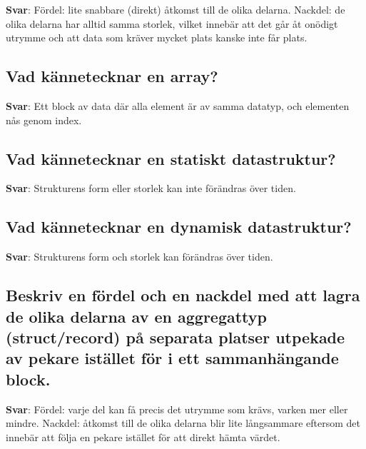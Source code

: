 \documentclass[a4paper,11pt,oneside]{article}
\begin{document}
\begin{sloppypar}
\label{q:272:sa:sv:True}

\textbf{Svar}: F\"ordel: lite snabbare (direkt) \r{a}tkomst till de olika delarna. Nackdel: de olika delarna har alltid samma storlek, vilket inneb\"ar att det g\r{a}r \r{a}t on\"odigt utrymme och att data som kr\"aver mycket plats kanske inte f\r{a}r plats.



\subsection{Vad k\"annetecknar en array?}

\label{q:273:sa:sv:True}

\textbf{Svar}: Ett block av data d\"ar alla element \"ar av samma datatyp, och elementen n\r{a}s genom index.



\subsection{Vad k\"annetecknar en statiskt datastruktur?}

\label{q:274:sa:sv:True}

\textbf{Svar}: Strukturens form eller storlek kan inte f\"or\"andras \"over tiden.



\subsection{Vad k\"annetecknar en dynamisk datastruktur?}

\label{q:275:sa:sv:True}

\textbf{Svar}: Strukturens form och storlek kan f\"or\"andras \"over tiden.



\subsection{Beskriv en f\"ordel och en nackdel med att lagra de olika delarna av en aggregattyp (struct/record) p\r{a} separata platser utpekade av pekare ist\"allet f\"or i ett sammanh\"angande block.}

\label{q:276:sa:sv:True}

\textbf{Svar}: F\"ordel: varje del kan f\r{a} precis det utrymme som kr\"avs, varken mer eller mindre. Nackdel: \r{a}tkomst till de olika delarna blir lite l\r{a}ngsammare eftersom det inneb\"ar att f\"olja en pekare ist\"allet f\"or att direkt h\"amta v\"ardet.




\end{sloppypar}
\end{document}
